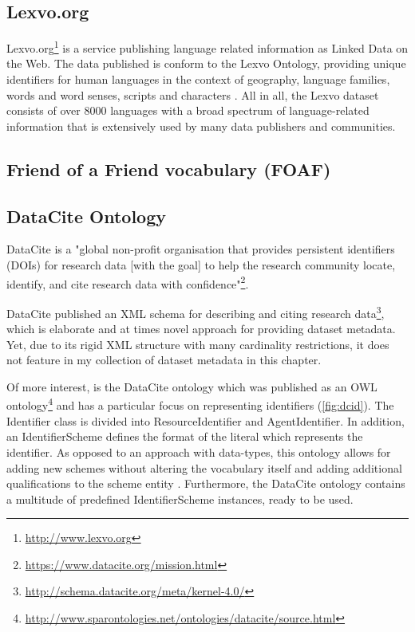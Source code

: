 \documentclass[a4paper,english,twoside,BCOR1.5cm,headsepline,DIV12,appendixprefix,final,12pt]{scrbook}
\newcommand\footnoteurl[1]{\footnote{\scriptsize\url{#1}}}
\begin{document}
\subsection{Lexvo.org}
\label{sec:lexvo}
Lexvo.org\footnoteurl{http://www.lexvo.org} is a service publishing language related information as Linked Data on the Web. The data published is conform to the Lexvo Ontology, providing unique identifiers for human languages in the context of geography, language families, words and word senses, scripts and characters \cite{Lexvo2015DeMelo}. All in all, the Lexvo dataset consists of over 8000 languages with a broad spectrum of language-related information that is extensively used by many data publishers and communities.

\subsection{Friend of a Friend vocabulary (FOAF)}
\label{sec:foaf}
\cite{Brickley-2014} 

\subsection{DataCite Ontology}
\label{sec:dcid}
DataCite is a "global non-profit organisation that provides persistent identifiers (DOIs) for research data [with the goal] to help the research community locate, identify, and cite research data with confidence"\footnoteurl{https://www.datacite.org/mission.html}. 

DataCite published an XML schema for describing and citing research data\footnoteurl{http://schema.datacite.org/meta/kernel-4.0/}, which is elaborate and at times novel approach for providing dataset metadata. Yet, due to its rigid XML structure with many cardinality restrictions, it does not feature in my collection of dataset metadata in this chapter. 

Of more interest, is the DataCite ontology which was published as an OWL ontology\footnoteurl{http://www.sparontologies.net/ontologies/datacite/source.html} and has a particular focus on representing identifiers (\cref{fig:dcid}). The Identifier class is divided into ResourceIdentifier and AgentIdentifier. In addition, an IdentifierScheme defines the format of the literal which represents the identifier. As opposed to an approach with data-types, this ontology allows for adding new schemes without altering the vocabulary itself and adding additional qualifications to the scheme entity \cite{Peroni2016}. Furthermore, the DataCite ontology contains a multitude of predefined IdentifierScheme instances, ready to be used. 
\end{document}
